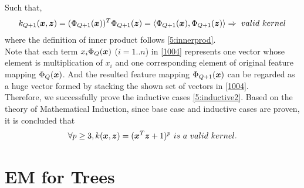 \documentclass[11pt,a4paper]{article}
\newcommand{\htab}{\hspace*{0.63cm}}
\newcommand{\bs}[1]{\boldsymbol{#1}}
\newcommand{\pg}{\\[0.3cm]}
\newcommand{\bmu}{\boldsymbol{\mu}}
\newcommand{\N}{\mathcal{N}}
\begin{document}
\htab Such that,
    \begin{align}
        \kpnew = (\PhiQQ (\xx))^{T} \PhiQQ (\zz) = \langle \PhiQQ (\xx), \PhiQQ (\zz) \rangle 
        \Rightarrow\ valid\ kernel
    \end{align}
\htab where the definition of inner product follows \eqref{5:innerprod}. \\[0.1cm]
\htab Note that each term $x_{i} \PhiQ(\xx)$ ($i = 1 .. n$) in \eqref{1004} represents one vector whose element is multiplication of  $x_{i}$ and one corresponding element of original feature mapping $\PhiQ(\xx)$. And the resulted feature mapping $\PhiQQ(\xx)$ can be regarded as a huge vector formed by stacking the shown set of vectors in \eqref{1004}. \pg
\htab Therefore, we successfully prove the inductive cases \eqref{5:inductive2}. Based on the theory of Mathematical Induction, since base case and inductive cases are proven, it is concluded that 
        \begin{equation}
        \forall p \geq 3, \kernel = (\xx^{T}\zz + 1)^{p}\ is\ a\ valid\ kernel.
    \end{equation}
\newpage
\section{EM for Trees}
\newcommand{\muk}{\bs{\mu}_{k}}
\newcommand{\z}{\bs{z}}
\newcommand{\difxm}{\xn - \muk}
\newcommand{\Nk}{\N( \xn | \bmu_{k}, \sigma^{2} \bs{I})}
\newcommand{\Nx}{\N(\x | \bmu_{k}, \sigma^{2} \bs{I})}
\newcommand{\sumz}{\underset{\z}{\sum}}
\newcommand{\prodn}{\prod_{n=1}^{N}}
\newcommand{\sumk}{\sum_{k=1}^{K}}
\newcommand{\prodk}{\prod_{k=1}^{K}}
\newcommand{\pk}{\pi_{k}}
\newcommand{\coe}{ (2\pi)^{\frac{D}{2}} \sigma^{D} }
\newcommand{\logliki}{ln \Big(L(\XX) \Big) }
\newcommand{\partbmu}{\frac{\partial Q }{\partial \bmu_{k}} }
\newcommand{\lagl}{\mathcal{L}(\lambda)}
\newcommand{\zn}{\bs{z}_{n}}
\newcommand{\sumzn}{\sum_{\zn}}
\newcommand{\Nxn}{\N(\xn | \bmu_{k}, \sigma^{2} \bs{I})}
\end{document}

